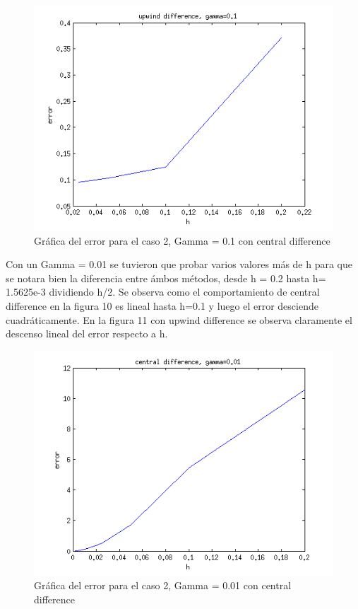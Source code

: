 \documentclass[11pt]{article}
\begin{document}
\begin{figure}[tbh]
	\centering
		\includegraphics[width=1.0\textwidth]{imagen9.png}
	\caption{Gr\'afica del error para el caso 2, Gamma = 0.1 con central difference}
	\label{fig:Fig1}
\end{figure}

\bigskip Con un Gamma = 0.01 se tuvieron que probar varios valores m\'as de h para que se notara bien la diferencia entre \'ambos m\'etodos, desde h = 0.2 hasta h= 1.5625e-3 dividiendo h/2. Se observa como el comportamiento de central difference en la figura 10 es lineal hasta h=0.1 y luego el error desciende cuadr\'aticamente. En la figura 11 con upwind difference se observa claramente el descenso lineal del error respecto a h. 

\begin{figure}[tbh]
	\centering
		\includegraphics[width=1.0\textwidth]{imagen10.png}
	\caption{Gr\'afica del error para el caso 2, Gamma = 0.01 con central difference}
	\label{fig:Fig1}
\end{figure}
\end{document}
